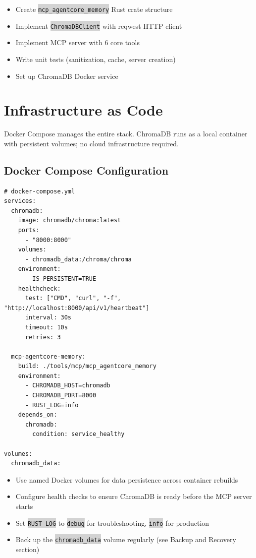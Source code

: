\documentclass[11pt,letterpaper]{article}
\newcommand{\faSquare}{\ding{111}}
\newcommand{\code}[1]{\texttt{\small\colorbox{lightgray}{#1}}}
\begin{document}
\begin{keybox}
\begin{itemize}
  \item[\faSquare] Create \code{mcp\_agentcore\_memory} Rust crate structure
  \item[\faSquare] Implement \code{ChromaDBClient} with reqwest HTTP client
  \item[\faSquare] Implement MCP server with 6 core tools
  \item[\faSquare] Write unit tests (sanitization, cache, server creation)
  \item[\faSquare] Set up ChromaDB Docker service
\end{itemize}
\end{keybox}

\section{Infrastructure as Code}

\begin{tldrbox}
Docker Compose manages the entire stack. ChromaDB runs as a local container with persistent volumes; no cloud infrastructure required.
\end{tldrbox}

\subsection{Docker Compose Configuration}

\begin{lstlisting}[caption={Full Docker Compose for memory stack}, language={}]
# docker-compose.yml
services:
  chromadb:
    image: chromadb/chroma:latest
    ports:
      - "8000:8000"
    volumes:
      - chromadb_data:/chroma/chroma
    environment:
      - IS_PERSISTENT=TRUE
    healthcheck:
      test: ["CMD", "curl", "-f", "http://localhost:8000/api/v1/heartbeat"]
      interval: 30s
      timeout: 10s
      retries: 3

  mcp-agentcore-memory:
    build: ./tools/mcp/mcp_agentcore_memory
    environment:
      - CHROMADB_HOST=chromadb
      - CHROMADB_PORT=8000
      - RUST_LOG=info
    depends_on:
      chromadb:
        condition: service_healthy

volumes:
  chromadb_data:
\end{lstlisting}

\begin{infobox}
\begin{itemize}
  \item Use named Docker volumes for data persistence across container rebuilds
  \item Configure health checks to ensure ChromaDB is ready before the MCP server starts
  \item Set \code{RUST\_LOG} to \code{debug} for troubleshooting, \code{info} for production
  \item Back up the \code{chromadb\_data} volume regularly (see Backup and Recovery section)
\end{itemize}
\end{infobox}
\end{document}
